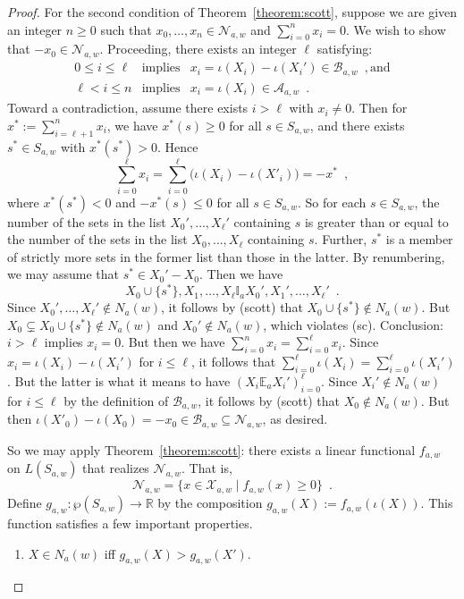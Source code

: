 \documentclass[12pt]{article}
\theoremstyle{definition}
\begin{document}
\begin{proof}
  For the second condition of Theorem~\ref{theorem:scott}, suppose we
  are given an integer $n\geq 0$ such that
  $x_0,\dots,x_n\in\mathcal{N}_{a,w}$ and $\sum_{i=0}^n x_i=0$.  We
  wish to show that $-x_0\in\mathcal{N}_{a,w}$.  Proceeding, there
  exists an integer $\ell$ satisfying:
  \begin{eqnarray*}
    0\leq i\leq\ell & \text{implies} &
    x_i=\iota(X_i)-\iota(X_i')\in\mathcal{B}_{a,w} 
    \enspace,\text{and}
    \\
    \ell<i\leq n & \text{implies} &
    x_i=\iota(X_i)\in\mathcal{A}_{a,w} \enspace.
  \end{eqnarray*}
  Toward a contradiction, assume there exists $i>\ell$ with $x_i\neq
  0$.  Then for $x^*:=\sum_{i=\ell+1}^n x_i$, we have $x^*(s)\geq 0$
  for all $s\in S_{a,w}$, and there exists $s^*\in S_{a,w}$ with
  $x^*(s^*)>0$. Hence
  \[
  \textstyle \sum_{i=0}^\ell x_i=
  \sum_{i=0}^\ell\bigl(\iota(X_i)-\iota(X'_i)\bigr)=-x^*\enspace,
  \]
  where $x^*(s^*)<0$ and $-x^*(s)\leq 0$ for all $s\in S_{a,w}$.  So
  for each $s\in S_{a,w}$, the number of the sets in the list
  $X_0',\dots,X_\ell'$ containing $s$ is greater than or equal to the
  number of the sets in the list $X_0,\dots,X_\ell$ containing $s$.
  Further, $s^*$ is a member of strictly more sets in the former list
  than those in the latter.  By renumbering, we may assume that
  $s^*\in X_0'-X_0$.  Then we have
  \[
  X_0\cup\{s^*\},X_1,\dots,X_\ell \mathbb{I}_a
  X_0',X_1',\dots,X_\ell'\enspace.
  \]
  Since $X_0',\dots,X_\ell'\notin N_a(w)$, it follows by (scott) that
  $X_0\cup\{s^*\}\notin N_a(w)$.  But $X_0\subsetneq
  X_0\cup\{s^*\}\notin N_a(w)$ and $X_0'\notin N_a(w)$, which violates
  (sc).  Conclusion: $i>\ell$ implies $x_i=0$.  But then we have
  $\sum_{i=0}^n x_i=\sum_{i=0}^\ell x_i$.  Since
  $x_i=\iota(X_i)-\iota(X_i')$ for $i\leq\ell$, it follows that
  $\sum_{i=0}^\ell\iota(X_i)=\sum_{i=0}^\ell\iota(X_i')$. But the
  latter is what it means to have $(X_i\mathbb{E}_aX_i')_{i=0}^\ell$.
  Since $X_i'\notin N_a(w)$ for $i\leq\ell$ by the definition of
  $\mathcal{B}_{a,w}$, it follows by (scott) that $X_0\notin N_a(w)$.
  But then $\iota(X'_0)-\iota(X_0)=-x_0\in\mathcal{B}_{a,w} \subseteq
  \mathcal{N}_{a,w}$, as desired.

  So we may apply Theorem~\ref{theorem:scott}: there exists a linear
  functional $f_{a,w}$ on $L(S_{a,w})$ that realizes
  $\mathcal{N}_{a,w}$.  That is,
  \[
  \mathcal{N}_{a,w}=\{x\in\mathcal{X}_{a,w}\mid f_{a,w}(x)\geq
  0\}\enspace.
  \]
  Define $g_{a,w}:\wp(S_{a,w})\to\mathbb{R}$ by the composition
  $g_{a,w}(X):=f_{a,w}(\iota(X))$.  This function satisfies a few
  important properties.
  \begin{enumerate}
  \item \label{prop:XinN} $X\in N_a(w)$ iff $g_{a,w}(X)>g_{a,w}(X')$.


\end{enumerate}
\end{proof}
\end{document}
